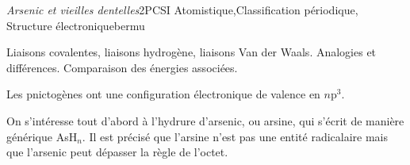 
\begin{exercise}{\emph{Arsenic et vieilles dentelles}}{2}{PCSI}
{Atomistique,Classification périodique, Structure électronique}{bermu}

\begin{questions}
    \questioncours Liaisons covalentes, liaisons hydrogène, liaisons Van der Waals. Analogies et différences. Comparaison des énergies associées.
    
    
    \question Les pnictogènes ont une configuration électronique de valence en $n$p$^3$.

    \question On s'intéresse tout d'abord à l'hydrure d'arsenic, ou arsine, qui s'écrit de manière générique AsH$_n$. Il est précisé que l'arsine n'est pas une entité radicalaire mais que l'arsenic peut dépasser la règle de l'octet.
\end{questions}
\end{exercise}
